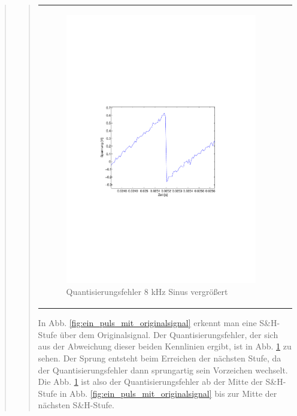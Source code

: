 \begin{quote}
\begin{quote}
\begin{center}
\begin{tabular}{ll}
            \begin{minipage}{0.6\textwidth}
                \begin{figure}[H]
                    \includegraphics[scale=0.67, trim = 33mm 95mm 16mm 80mm, clip]{Bilder/Quant_steile_flanken}
                    \caption{Quantisierungsfehler 8 kHz Sinus vergrößert}
                    \label{fig:steile_flanke}
                \end{figure}
            \end{minipage} 
        
        \end{tabular}
        \end{center}
        
        
        \vspace{2em}
        
        In Abb. \ref{fig:ein_puls_mit_originalsignal} erkennt man eine S\&H-Stufe über dem Originalsignal. Der
        Quantisierungsfehler, der sich aus der Abweichung dieser beiden Kennlinien ergibt, ist in Abb.
        \ref{fig:steile_flanke} zu sehen. Der Sprung entsteht beim Erreichen der nächsten Stufe, da der
        Quantisierungsfehler dann sprungartig sein Vorzeichen wechselt. Die Abb. \ref{fig:steile_flanke} ist also der
        Quantisierungsfehler ab der Mitte der S\&H-Stufe in Abb. \ref{fig:ein_puls_mit_originalsignal} bis zur Mitte der
        nächsten S\&H-Stufe.
        

\end{quote}
\end{quote}
